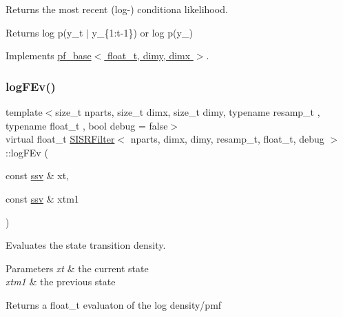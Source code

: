 Returns the most recent (log-\/) conditiona likelihood. 

\begin{DoxyReturn}{Returns}
log p(y\+\_\+t $\vert$ y\+\_\+\{1\+:t-\/1\}) or log p(y\+\_) 
\end{DoxyReturn}


Implements \hyperlink{classpf__base_a350df818820d6ab0fd6d413022b7f23b}{pf\+\_\+base$<$ float\+\_\+t, dimy, dimx $>$}.

\mbox{\label{classSISRFilter_a1f888124bcec1ebaaec3b4e1afd3fa74}} 
\subsubsection{\texorpdfstring{log\+F\+Ev()}{logFEv()}}
{\footnotesize\ttfamily template$<$size\+\_\+t nparts, size\+\_\+t dimx, size\+\_\+t dimy, typename resamp\+\_\+t , typename float\+\_\+t , bool debug = false$>$ \\
virtual float\+\_\+t \hyperlink{classSISRFilter}{S\+I\+S\+R\+Filter}$<$ nparts, dimx, dimy, resamp\+\_\+t, float\+\_\+t, debug $>$\+::log\+F\+Ev (\begin{DoxyParamCaption}\item[{const \hyperlink{classSISRFilter_ada0fdfca451ed6a22a8bba48a881819d}{ssv} \&}]{xt,  }\item[{const \hyperlink{classSISRFilter_ada0fdfca451ed6a22a8bba48a881819d}{ssv} \&}]{xtm1 }\end{DoxyParamCaption})\hspace{0.3cm}{\ttfamily [pure virtual]}}



Evaluates the state transition density. 


\begin{DoxyParams}{Parameters}
{\em xt} & the current state \\
\hline
{\em xtm1} & the previous state \\
\hline
\end{DoxyParams}
\begin{DoxyReturn}{Returns}
a float\+\_\+t evaluaton of the log density/pmf 
\end{DoxyReturn}
\mbox{\label{classSISRFilter_ad87c1090d23ed5da2a5ff6ddbca6a408}} 
